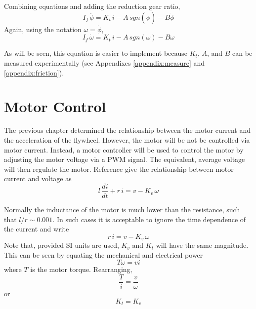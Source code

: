 \documentclass[12pt,letterpaper]{article}
\begin{document}
Combining equations and adding the reduction gear ratio,
%
\begin{equation}
    I_{f} \, \ddot{\phi}  = K_{t} \, i - A \, sgn(\dot{\phi} ) - B \dot{\phi}
\end{equation}
%
Again, using the notation $\omega = \dot{\phi}$,
%
\begin{equation}
    I_{f} \, \dot{\omega}  = K_{t} \, i - A \, sgn(\omega) - B \omega \label{wheel}
\end{equation}
%

As will be seen, this equation is easier to implement because $K_{t}$, $A$, and $B$ can be measured experimentally (see Appendixes \ref{appendix:measure} and \ref{appendix:friction}).







\section{Motor Control}
The previous chapter determined the relationship between the motor current and the acceleration of the flywheel.  
However, the motor will be not be controlled via motor current.  Instead, a motor controller will be used to control the 
motor by adjusting the motor voltage via a PWM signal.  The equivalent, average voltage will then regulate the motor.  
Reference \cite{monograph} give the relationship between motor current and voltage as
%
\begin{equation}
    l \, \frac{di}{dt} + r \,i = v - K_{v} \, \omega
\end{equation}
%


Normally the inductance of the motor is much lower than the resistance, such that $l/r \sim 0.001$.  
In such cases it is acceptable to ignore the time dependence of the current and write
%
\begin{equation}
    r \,i = v - K_{v} \, \omega \label{motor}
\end{equation}
%
Note that, provided SI units are used, $K_{v}$ and $K_{t}$ will have the same magnitude.  This can be seen by equating the 
mechanical and electrical power
%
\begin{equation}
    T \omega = v i
\end{equation}
%
where $T$ is the motor torque.
Rearranging,
%
\begin{equation}
    \frac{T}{i} = \frac{v}{\omega}
\end{equation}
%
or
%
\begin{equation}
    K_{t} = K_{v} 
\end{equation}
%
\end{document}
